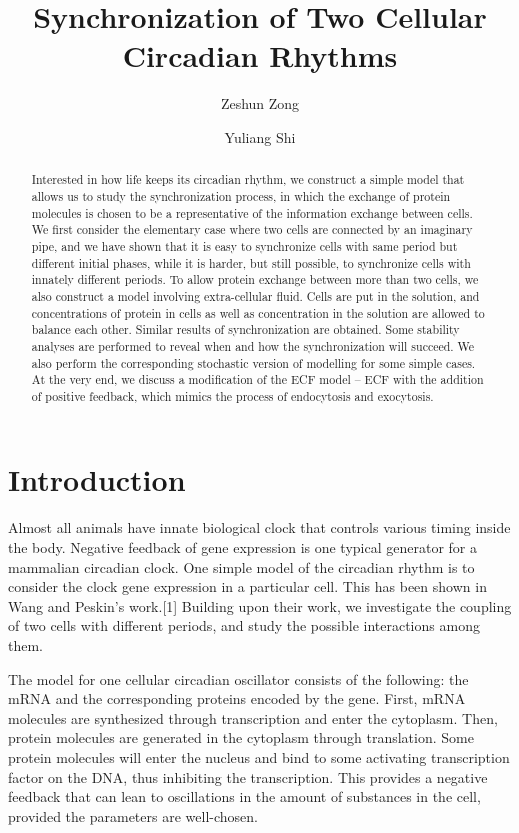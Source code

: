 \documentclass[12pt]{article}
\renewcommand{\(}{\left (}
\renewcommand{\)}{\right )}
\begin{document}
\title{Synchronization of Two Cellular Circadian Rhythms}
\date{}
\author[1]{Zeshun Zong}
\author[2]{Yuliang Shi}


\maketitle
\begin{abstract}
Interested in how life keeps its circadian rhythm, we construct a simple model that allows us to study the synchronization process, in which the exchange of protein molecules is chosen to be a representative of the information exchange between cells. We first consider the elementary case where two cells are connected by an imaginary pipe, and we have shown that it is easy to synchronize cells with same period but different initial phases, while it is harder, but still possible, to synchronize cells with innately different periods. To allow protein exchange between more than two cells, we also construct a model involving extra-cellular fluid. Cells are put in the solution, and concentrations of protein in cells as well as concentration in the solution are allowed to balance each other. Similar results of synchronization are obtained. Some stability analyses are performed to reveal when and how the synchronization will succeed. We also perform the corresponding stochastic version of modelling for some simple cases. At the very end, we discuss a modification of the ECF model -- ECF with the addition of positive feedback, which mimics the process of endocytosis and exocytosis.
\end{abstract}

\section{Introduction}

\hspace{5mm} Almost all animals have innate biological clock that controls various timing inside the body. Negative feedback of gene expression is one typical generator for a mammalian circadian clock. One simple model of the circadian rhythm is to consider the clock gene expression in a particular cell. This has been shown in Wang and Peskin's work.[1] Building upon their work, we investigate the coupling of two cells with different periods, and study the possible interactions among them.

The model for one cellular circadian oscillator consists of the following: the mRNA and the corresponding proteins encoded by the gene. First, mRNA molecules are synthesized through transcription and enter the cytoplasm. Then, protein molecules are generated in the cytoplasm through translation. Some protein molecules will enter the nucleus and bind to some activating transcription factor on the DNA, thus inhibiting the transcription. This provides a negative feedback that can lean to oscillations in the amount of substances in the cell, provided the parameters are well-chosen.
\end{document}

